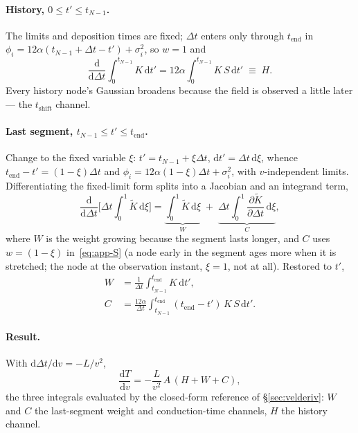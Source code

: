 \documentclass[11pt]{article}
\newcommand{\dd}{\mathrm{d}}
\begin{document}
\paragraph{History, $0 \le t' \le t_{N-1}$.} The limits and deposition times
are fixed; $\Delta t$ enters only through $t_{\mathrm{end}}$ in
$\phi_i = 12\alpha(t_{N-1}+\Delta t - t') + \sigma_i^2$, so $w=1$ and
\begin{equation}
  \frac{\dd}{\dd\Delta t}\!\int_0^{t_{N-1}}\! K\,\dd t'
  = 12\alpha \int_0^{t_{N-1}} K\,S\,\dd t' \;\equiv\; H .
  \label{eq:app-H}
\end{equation}
Every history node's Gaussian broadens because the field is observed a little
later --- the $t_{\mathrm{shift}}$ channel.

\paragraph{Last segment, $t_{N-1}\le t' \le t_{\mathrm{end}}$.} Change to the
fixed variable $\xi$: $t' = t_{N-1}+\xi\Delta t$, $\dd t' = \Delta t\,\dd\xi$,
whence $t_{\mathrm{end}}-t' = (1-\xi)\Delta t$ and $\phi_i = 12\alpha(1-\xi)
\Delta t + \sigma_i^2$, with $v$-independent limits. Differentiating the
fixed-limit form splits into a Jacobian and an integrand term,
\begin{equation}
  \frac{\dd}{\dd\Delta t}\Big[\Delta t \!\int_0^1\! \tilde K\,\dd\xi\Big]
  = \underbrace{\int_0^1 \tilde K\,\dd\xi}_{W}
  \;+\; \underbrace{\Delta t\!\int_0^1 \frac{\partial\tilde K}{\partial\Delta t}\,\dd\xi}_{C},
\end{equation}
where $W$ is the weight growing because the segment lasts longer, and $C$ uses
$w = (1-\xi)$ in~\eqref{eq:app-S} (a node early in the segment ages more when it
is stretched; the node at the observation instant, $\xi=1$, not at all).
Restored to $t'$,
\begin{align}
  W &= \frac{1}{\Delta t}\int_{t_{N-1}}^{t_{\mathrm{end}}} K\,\dd t', \label{eq:app-W}\\
  C &= \frac{12\alpha}{\Delta t}\int_{t_{N-1}}^{t_{\mathrm{end}}}
        (t_{\mathrm{end}}-t')\,K\,S\,\dd t'. \label{eq:app-C}
\end{align}

\paragraph{Result.} With $\dd\Delta t/\dd v = -L/v^2$,
\begin{equation}
  \frac{\dd T}{\dd v} = -\frac{L}{v^2}\,A\,(H + W + C),
  \label{eq:app-dTdv}
\end{equation}
the three integrals evaluated by the closed-form reference of
\S\ref{sec:velderiv}: $W$ and $C$ the last-segment weight and conduction-time
channels, $H$ the history channel.
\end{document}
